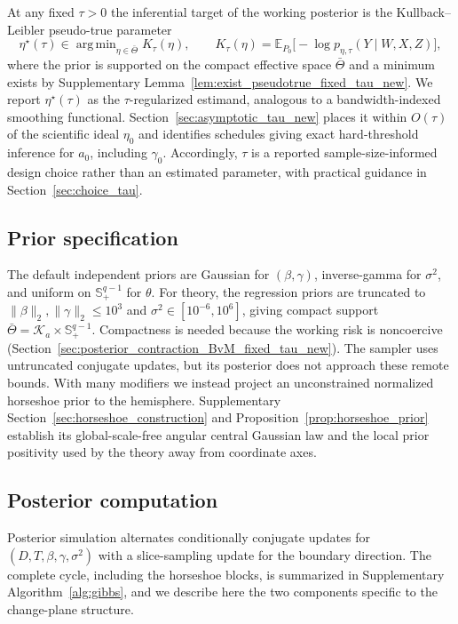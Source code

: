 \documentclass[11pt]{article}
\theoremstyle{definition}
\theoremstyle{plain}
\newcommand{\E}{\mathbb{E}}
\DeclareMathOperator*{\argmin}{arg\,min}
\begin{document}
At any fixed $\tau>0$ the inferential target of the working posterior is the Kullback--Leibler pseudo-true parameter
\begin{equation}
\eta^\star(\tau)\in\argmin_{\eta\in\bar\Theta}K_\tau(\eta),\qquad
K_\tau(\eta)=\E_{P_0}\big[-\log p_{\eta,\tau}(Y\mid W,X,Z)\big],
\label{eq:pseudo_true}
\end{equation}
where the prior is supported on the compact effective space $\bar\Theta$ and a minimum exists by Supplementary Lemma~\ref{lem:exist_pseudotrue_fixed_tau_new}. We report $\eta^\star(\tau)$ as the $\tau$-regularized estimand, analogous to a bandwidth-indexed smoothing functional. Section~\ref{sec:asymptotic_tau_new} places it within $O(\tau)$ of the scientific ideal $\eta_0$ and identifies schedules giving exact hard-threshold inference for $a_0$, including $\gamma_0$. Accordingly, $\tau$ is a reported sample-size-informed design choice rather than an estimated parameter, with practical guidance in Section~\ref{sec:choice_tau}.

\subsection{Prior specification}\label{sec:priors}

The default independent priors are Gaussian for $(\beta,\gamma)$, inverse-gamma for $\sigma^2$, and uniform on $\mathbb S^{q-1}_+$ for $\theta$. For theory, the regression priors are truncated to $\|\beta\|_2,\|\gamma\|_2\le10^3$ and $\sigma^2\in[10^{-6},10^6]$, giving compact support $\bar\Theta=\mathcal K_a\times\mathbb S^{q-1}_+$. Compactness is needed because the working risk is noncoercive (Section~\ref{sec:posterior_contraction_BvM_fixed_tau_new}). The sampler uses untruncated conjugate updates, but its posterior does not approach these remote bounds. With many modifiers we instead project an unconstrained normalized horseshoe prior \citep{Carvalho2009} to the hemisphere. Supplementary Section~\ref{sec:horseshoe_construction} and Proposition~\ref{prop:horseshoe_prior} establish its global-scale-free angular central Gaussian law and the local prior positivity used by the theory away from coordinate axes.

\subsection{Posterior computation}\label{sec:inference}

Posterior simulation alternates conditionally conjugate updates for $(D,T,\beta,\gamma,\sigma^2)$ with a slice-sampling update for the boundary direction. The complete cycle, including the horseshoe blocks, is summarized in Supplementary Algorithm~\ref{alg:gibbs}, and we describe here the two components specific to the change-plane structure.
\end{document}
